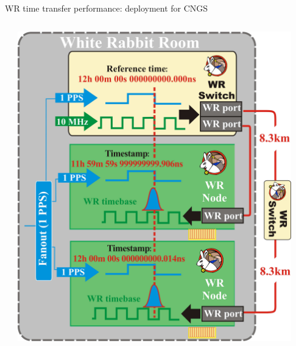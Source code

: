 \documentclass[compress,red]{beamer}
\begin{document}
\begin{frame}{WR time transfer performance: deployment for CNGS}
\begin{columns}[c]
\begin{center}
	  \end{center}
		\begin{center}
		\includegraphics[width=0.93\textwidth]{measurements/performance_testing_setup-detail_v2.pdf}
		\end{center}
  \end{columns}
\end{frame}




\end{document}
